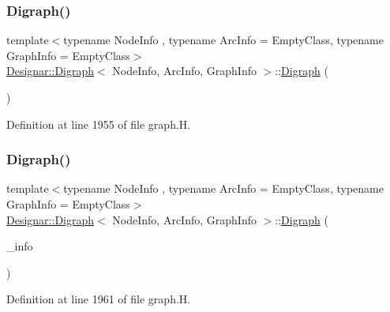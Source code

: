\subsubsection{\texorpdfstring{Digraph()}{Digraph()}\hspace{0.1cm}{\footnotesize\ttfamily [1/5]}}
{\footnotesize\ttfamily template$<$typename Node\+Info , typename Arc\+Info  = Empty\+Class, typename Graph\+Info  = Empty\+Class$>$ \\
\hyperlink{class_designar_1_1_digraph}{Designar\+::\+Digraph}$<$ Node\+Info, Arc\+Info, Graph\+Info $>$\+::\hyperlink{class_designar_1_1_digraph}{Digraph} (\begin{DoxyParamCaption}{ }\end{DoxyParamCaption})\hspace{0.3cm}{\ttfamily [inline]}}



Definition at line 1955 of file graph.\+H.

\mbox{\label{class_designar_1_1_digraph_ae5210934b3e6e64caceffee62ff1fcad}} 
\subsubsection{\texorpdfstring{Digraph()}{Digraph()}\hspace{0.1cm}{\footnotesize\ttfamily [2/5]}}
{\footnotesize\ttfamily template$<$typename Node\+Info , typename Arc\+Info  = Empty\+Class, typename Graph\+Info  = Empty\+Class$>$ \\
\hyperlink{class_designar_1_1_digraph}{Designar\+::\+Digraph}$<$ Node\+Info, Arc\+Info, Graph\+Info $>$\+::\hyperlink{class_designar_1_1_digraph}{Digraph} (\begin{DoxyParamCaption}\item[{const Graph\+Info \&}]{\+\_\+info }\end{DoxyParamCaption})\hspace{0.3cm}{\ttfamily [inline]}}



Definition at line 1961 of file graph.\+H.

\mbox{\label{class_designar_1_1_digraph_a534b12da4e0aeb32cff655f05e6c91a4}} 
